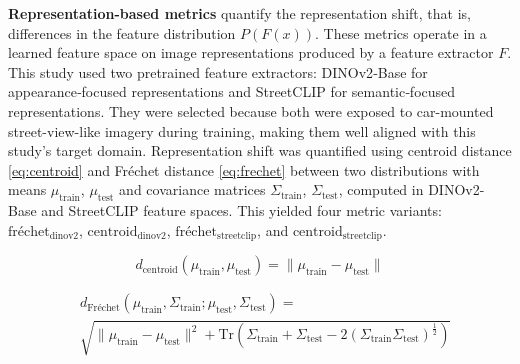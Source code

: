 \documentclass[conference]{IEEEtran}
\begin{document}
\textbf{Representation-based metrics} quantify the representation shift, that is, differences in the feature distribution $P(F(x))$. These metrics operate in a learned feature space on image representations produced by a feature extractor $F$. This study used two pretrained feature extractors: DINOv2‑Base \cite{oquab2024} for appearance‑focused representations and StreetCLIP \cite{haas2023} for semantic‑focused representations. They were selected because both were exposed to car-mounted street-view-like imagery during training, making them well aligned with this study's target domain. Representation shift was quantified using centroid distance \eqref{eq:centroid} and Fréchet distance \eqref{eq:frechet} \cite{NIPS2017_8a1d6947} between two distributions with means $\mu_{\text{train}}$, $\mu_{\text{test}}$ and covariance matrices $\Sigma_{\text{train}}$, $\Sigma_{\text{test}}$, computed in DINOv2-Base and StreetCLIP feature spaces. This yielded four metric variants: $\text{fréchet}_{\text{dinov2}}$, $\text{centroid}_{\text{dinov2}}$, $\text{fréchet}_{\text{streetclip}}$, and $\text{centroid}_{\text{streetclip}}$.

\begin{equation}
\label{eq:centroid}
d_{\text{centroid}}(\mu_{\text{train}},\mu_{\text{test}}) = \|\mu_{\text{train}} - \mu_{\text{test}}\|
\end{equation}

\begin{equation}
\label{eq:frechet}
\begin{aligned}
&d_{\text{Fréchet}}(\mu_{\text{train}},\Sigma_{\text{train}};\mu_{\text{test}},\Sigma_{\text{test}}) = \\
&\sqrt{
\|\mu_{\text{train}} - \mu_{\text{test}}\|^2
+ \mathrm{Tr}\!\left(\Sigma_{\text{train}} + \Sigma_{\text{test}} - 2(\Sigma_{\text{train}} \Sigma_{\text{test}})^{\frac{1}{2}}\right)
}
\end{aligned}
\end{equation}
\end{document}
